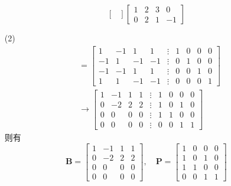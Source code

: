 \documentclass[12pt, a4paper, oneside, fontset=none]{ctexart}
\begin{document}
\begin{enumerate}
$$\begin{bmatrix}
            \end{bmatrix} \begin{bmatrix}
                1 & 2 & 3 & 0  \\
                0 & 2 & 1 & -1
            \end{bmatrix}
        $$
    \item[(2)]
        \begin{align*}
            [\bm{A} \vdots \bm{I}] & = \begin{bmatrix}
                                           1  & -1 & 1  & 1  & \vdots & 1 & 0 & 0 & 0 \\
                                           -1 & 1  & -1 & -1 & \vdots & 0 & 1 & 0 & 0 \\
                                           -1 & -1 & 1  & 1  & \vdots & 0 & 0 & 1 & 0 \\
                                           1  & 1  & -1 & -1 & \vdots & 0 & 0 & 0 & 1
                                       \end{bmatrix} \\
                                   & \to \begin{bmatrix}
                                             1 & -1 & 1 & 1 & \vdots & 1 & 0 & 0 & 0 \\
                                             0 & -2 & 2 & 2 & \vdots & 1 & 0 & 1 & 0 \\
                                             0 & 0  & 0 & 0 & \vdots & 1 & 1 & 0 & 0 \\
                                             0 & 0  & 0 & 0 & \vdots & 0 & 0 & 1 & 1
                                         \end{bmatrix}
        \end{align*}
        则有
        $$
            \bm{B} = \begin{bmatrix}
                1 & -1 & 1 & 1 \\
                0 & -2 & 2 & 2 \\
                0 & 0  & 0 & 0 \\
                0 & 0  & 0 & 0
            \end{bmatrix}, \quad
            \bm{P} = \begin{bmatrix}
                1 & 0 & 0 & 0 \\
                1 & 0 & 1 & 0 \\
                1 & 1 & 0 & 0 \\
                0 & 0 & 1 & 1

\end{bmatrix}$$
\end{enumerate}
\end{document}
